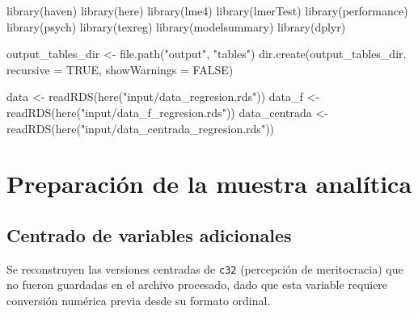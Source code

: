 \documentclass[
  spanish,
  a4paper,
  oneside]{scrbook}
\newenvironment{Shaded}{\begin{snugshade}}{\end{snugshade}}
\newcommand{\AttributeTok}[1]{\textcolor[rgb]{0.40,0.45,0.13}{#1}}
\newcommand{\ConstantTok}[1]{\textcolor[rgb]{0.56,0.35,0.01}{#1}}
\newcommand{\FunctionTok}[1]{\textcolor[rgb]{0.28,0.35,0.67}{#1}}
\newcommand{\NormalTok}[1]{\textcolor[rgb]{0.00,0.23,0.31}{#1}}
\newcommand{\OtherTok}[1]{\textcolor[rgb]{0.00,0.23,0.31}{#1}}
\newcommand{\StringTok}[1]{\textcolor[rgb]{0.13,0.47,0.30}{#1}}
\begin{document}
\begin{Shaded}
\begin{Highlighting}[]
\FunctionTok{library}\NormalTok{(haven)}
\FunctionTok{library}\NormalTok{(here)}
\FunctionTok{library}\NormalTok{(lme4)}
\FunctionTok{library}\NormalTok{(lmerTest)}
\FunctionTok{library}\NormalTok{(performance)}
\FunctionTok{library}\NormalTok{(psych)}
\FunctionTok{library}\NormalTok{(texreg)}
\FunctionTok{library}\NormalTok{(modelsummary)}
\FunctionTok{library}\NormalTok{(dplyr)}

\NormalTok{output\_tables\_dir }\OtherTok{\textless{}{-}} \FunctionTok{file.path}\NormalTok{(}\StringTok{"output"}\NormalTok{, }\StringTok{"tables"}\NormalTok{)}
\FunctionTok{dir.create}\NormalTok{(output\_tables\_dir, }\AttributeTok{recursive =} \ConstantTok{TRUE}\NormalTok{, }\AttributeTok{showWarnings =} \ConstantTok{FALSE}\NormalTok{)}

\NormalTok{data          }\OtherTok{\textless{}{-}} \FunctionTok{readRDS}\NormalTok{(}\FunctionTok{here}\NormalTok{(}\StringTok{"input/data\_regresion.rds"}\NormalTok{))}
\NormalTok{data\_f        }\OtherTok{\textless{}{-}} \FunctionTok{readRDS}\NormalTok{(}\FunctionTok{here}\NormalTok{(}\StringTok{"input/data\_f\_regresion.rds"}\NormalTok{))}
\NormalTok{data\_centrada }\OtherTok{\textless{}{-}} \FunctionTok{readRDS}\NormalTok{(}\FunctionTok{here}\NormalTok{(}\StringTok{"input/data\_centrada\_regresion.rds"}\NormalTok{))}
\end{Highlighting}
\end{Shaded}

\chapter{Preparación de la muestra
analítica}\label{preparaciuxf3n-de-la-muestra-analuxedtica}

\section{Centrado de variables
adicionales}\label{centrado-de-variables-adicionales}

Se reconstruyen las versiones centradas de \texttt{c32} (percepción de
meritocracia) que no fueron guardadas en el archivo procesado, dado que
esta variable requiere conversión numérica previa desde su formato
ordinal.
\end{document}
